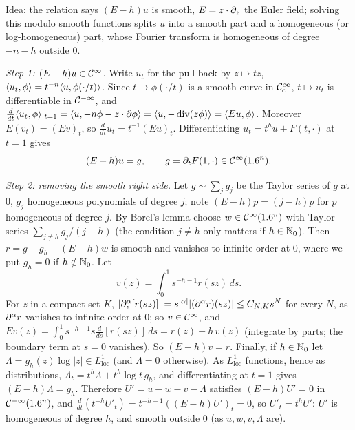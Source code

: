 Idea: the relation says $(E-h)u$ is smooth, $E=z\cdot\partial_z$ the Euler field; solving this
modulo smooth functions splits $u$ into a smooth part and a homogeneous (or log-homogeneous)
part, whose Fourier transform is homogeneous of degree $-n-h$ outside $0$.

\emph{Step 1: $(E-h)u\in\mathcal{C}^\infty$.} Write $u_t$ for the pull-back by $z\mapsto tz$, $\langle u_t, \phi\rangle=
t^{-n}\langle u, \phi(\cdot/t)\rangle$. Since $t\mapsto\phi(\cdot/t)$ is a smooth curve in $\mathcal{C}^\infty_{\mathrm{c}}$,
$t\mapsto u_t$ is differentiable in $\mathcal{C}^{-\infty}$, and
$\frac d{dt}\langle u_t, \phi\rangle|_{t=1}=\langle u, -n\phi-z\cdot\partial\phi\rangle=\langle u, -\operatorname{div}
(z\phi)\rangle=\langle Eu, \phi\rangle$.
Moreover $E(v_t)=(Ev)_t$, so $\frac d{dt}u_t=t^{-1}(Eu)_t$. Differentiating $u_t=t^hu+F(t,\cdot)$
at $t=1$ gives
\begin{equation*}
(E-h)u=g,\qquad g=\partial_tF(1,\cdot)\in\mathcal{C}^\infty(1.6^n).
\end{equation*}

\emph{Step 2: removing the smooth right side.} Let $g\sim\sum_jg_j$ be the Taylor series of $g$
at $0$, $g_j$ homogeneous polynomials of degree $j$; note $(E-h)p=(j-h)p$ for $p$ homogeneous
of degree $j$. By Borel's lemma choose $w\in\mathcal{C}^\infty(1.6^n)$ with Taylor series
$\sum_{j\ne h}g_j/(j-h)$ (the condition $j\ne h$ only matters if $h\in\mathbb{N}_0$). Then
$r=g-g_{h}-(E-h)w$ is smooth and vanishes to infinite order at $0$, where we put $g_h=0$ if
$h\notin\mathbb{N}_0$. Let
\begin{equation*}
v(z)=\int_0^1s^{-h-1}r(sz)\,ds .
\end{equation*}
For $z$ in a compact set $K$, $|\partial^\alpha_z[r(sz)]|=s^{|\alpha|}|(\partial^\alpha r)(sz)|\le
C_{N,K}s^{N}$ for every $N$, as $\partial^\alpha r$ vanishes to infinite order at $0$; so $v\in\mathcal{C}^\infty$,
and $Ev(z)=\int_0^1s^{-h-1}s\frac d{ds}[r(sz)]\,ds=r(z)+h\,v(z)$ (integrate by parts; the
boundary term at $s=0$ vanishes). So $(E-h)v=r$.
Finally, if $h\in\mathbb{N}_0$ let $\Lambda=g_h(z)\log|z|\in L^1_{\mathrm{loc}}$ (and $\Lambda=0$
otherwise). As $L^1_{\mathrm{loc}}$ functions, hence as distributions,
$\Lambda_t=t^h\Lambda+t^h\log t\,g_h$, and differentiating at $t=1$ gives $(E-h)\Lambda=g_h$.
Therefore $U'=u-w-v-\Lambda$ satisfies $(E-h)U'=0$ in $\mathcal{C}^{-\infty}(1.6^n)$, and
$\frac d{dt}(t^{-h}U'_t)=t^{-h-1}((E-h)U')_t=0$, so $U'_t=t^hU'$: $U'$ is homogeneous of
degree $h$, and smooth outside $0$ (as $u,w,v,\Lambda$ are).

